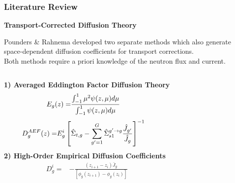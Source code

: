 \begin{frame}
  \frametitle{Literature Review}
  \textbf{Transport-Corrected Diffusion Theory}
  \vspace{.2cm}

  Pounders \& Rahnema \cite{pounders_diffusion_2009} developed two separate methods which also
  generate space-dependent diffusion coefficients for transport corrections. \\
  Both methods require a priori knowledge of the neutron flux and current.
  \vspace{.2cm}
  \begin{columns}
    \textbf{1) Averaged Eddington Factor Diffusion Theory}
    \begin{align}
      \small
      E_g(z) =& \frac{\int^1_{-1} \mu^2\psi(z,\mu)d\mu}{\int^1_{-1} \psi(z,\mu)d\mu}
    \end{align}
    \begin{align}
      \small
      D^{AEF}_g(z) =& E^i_g\left[\hat{\Sigma}_{t,g}-\sum^G_{g'=1}\hat{\Sigma}^{g'\rightarrow g}_{s1}
      \frac{\hat{J}_{g'}}{\hat{J}_g}\right]^{-1}
    \end{align}
    \hfill
    \textbf{2) High-Order Empirical Diffusion Coefficients}
    \begin{align}
      D^i_g =& -\frac{\left(z_{i+1}-z_i\right) \bar{J}_g}{\left[\phi_g(z_{i+1})-\phi_g(z_i)\right]}
      \label{eq:emp}
    \end{align}
  \end{columns}
\end{frame}


